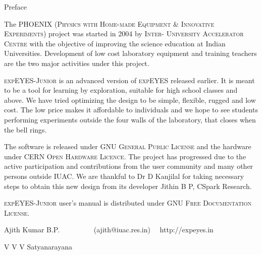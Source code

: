 \documentclass[12pt,a4paper]{report}
\begin{document}
\thispagestyle{empty}

Preface

The PHOENIX (\textsc{Physics with Home-made Equipment \& Innovative
Experiments}) project was started in 2004 by \textsc{Inter- University
Accelerator Centre} with the objective of improving the science
education at Indian Universities. Development of low cost laboratory
equipment and training teachers are the two major activities under
this project.

\textsc{expEYES-Junior} is an advanced version of \textsc{expEYES}
released earlier. It is meant to be a tool for learning by
exploration, suitable for high school classes and above. We have tried
optimizing the design to be simple, flexible, rugged and low cost.
The low price makes it affordable to individuals and we hope to see
students performing experiments outside the four walls of the
laboratory, that closes when the bell rings.

The software is released under \textsc{GNU General Public License} and
the hardware under \textsc{CERN Open Hardware Licence.} The project
has progressed due to the active participation and contributions from
the user community and many other persons outside \textsc{IUAC}. We
are thankful to Dr D Kanjilal for taking necessary steps to obtain
this new design from its developer Jithin B P, CSpark Research.

\textsc{expEYES-Junior} user's manual is distributed under \textsc{GNU
Free Documentation License}.



Ajith Kumar B.P. ~~~~~~~~~(ajith@iuac.res.in) ~~http://expeyes.in

V V V Satyanarayana
\end{document}
